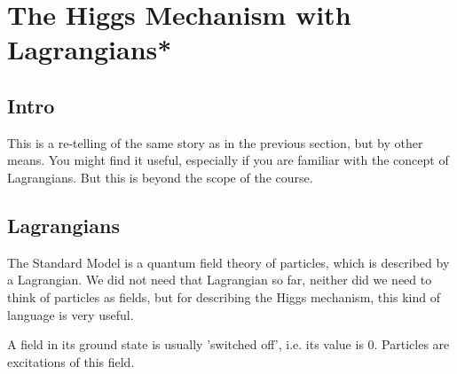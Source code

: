 \section{The Higgs Mechanism with Lagrangians*}
\subsection{Intro}
This is a re-telling of the same story as in the previous section, but by other means. You might find it useful, especially if you are familiar with the concept of Lagrangians. But this is beyond the scope of the course. 
\subsection{Lagrangians}
The Standard Model is a quantum field theory of particles, which is described by a Lagrangian. We did not need that Lagrangian so far, neither did we need to think of particles as fields, but for describing the Higgs mechanism, this kind of language is very useful.

A field in its ground state is usually 'switched off', i.e. its value is $0$. Particles are excitations of this field.

